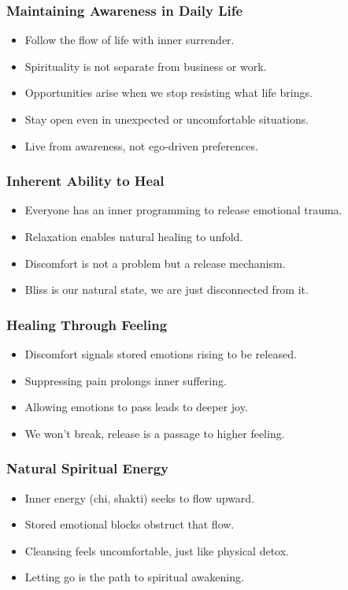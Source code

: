 \begin{frame}[fragile]\frametitle{Maintaining Awareness in Daily Life}
    \begin{itemize}
        \item Follow the flow of life with inner surrender.
        \item Spirituality is not separate from business or work.
        \item Opportunities arise when we stop resisting what life brings.
        \item Stay open even in unexpected or uncomfortable situations.
        \item Live from awareness, not ego-driven preferences.
    \end{itemize}
\end{frame}


\begin{frame}[fragile]\frametitle{Inherent Ability to Heal}
  \begin{itemize}
    \item Everyone has an inner programming to release emotional trauma.
    \item Relaxation enables natural healing to unfold.
    \item Discomfort is not a problem but a release mechanism.
    \item Bliss is our natural state, we are just disconnected from it.
  \end{itemize}
\end{frame}

\begin{frame}[fragile]\frametitle{Healing Through Feeling}
  \begin{itemize}
    \item Discomfort signals stored emotions rising to be released.
    \item Suppressing pain prolongs inner suffering.
    \item Allowing emotions to pass leads to deeper joy.
    \item We won't break, release is a passage to higher feeling.
  \end{itemize}
\end{frame}

\begin{frame}[fragile]\frametitle{Natural Spiritual Energy}
  \begin{itemize}
    \item Inner energy (chi, shakti) seeks to flow upward.
    \item Stored emotional blocks obstruct that flow.
    \item Cleansing feels uncomfortable, just like physical detox.
    \item Letting go is the path to spiritual awakening.
  \end{itemize}
\end{frame}


